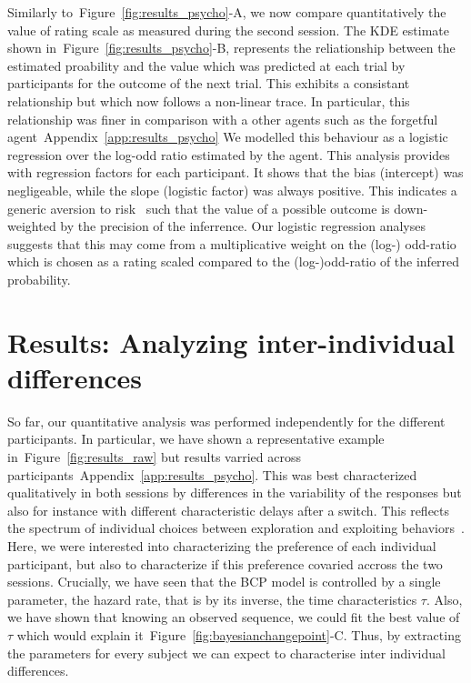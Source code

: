 \documentclass[profile,final,english,draft]{article}%
\newcommand{\citep}[1]{\parencite{#1}}
\newcommand{\seeFig}[1]{Figure~\ref{fig:#1}}
\newcommand{\seeApp}[1]{Appendix~\ref{app:#1}}
\begin{document}
Similarly to~\seeFig{results_psycho}-A,
we now compare quantitatively the value of rating scale
as measured during the second session.
The KDE estimate shown in~\seeFig{results_psycho}-B,
represents the reliationship between
the estimated proability
and the value which was predicted at each trial
by participants for the outcome of the next trial.
This exhibits a consistant relationship
but which now follows a non-linear trace.
In particular, this relationship was finer
in comparison with a other agents
such as the forgetful agent~\seeApp{results_psycho}
We modelled this behaviour as
a logistic regression over
the log-odd ratio estimated by the agent.
This analysis provides with regression factors for each participant.
It shows that the bias (intercept)
was negligeable, while the slope (logistic factor)
was always positive.
This indicates a generic aversion to risk~\citep{KanehmanXX}
such that the value of a possible outcome
is down-weighted by the precision of the inferrence.
Our logistic regression analyses
suggests that this may come from a multiplicative weight
on the (log-) odd-ratio which is chosen as a rating scaled
compared to the (log-)odd-ratio of the inferred probability.

\section{Results: Analyzing inter-individual differences}
\label{sec:inter}
So far, our quantitative analysis was performed independently
for the different participants.
In particular, we have shown a representative example in~\seeFig{results_raw}
but results varried across participants~\seeApp{results_psycho}.
This was best characterized qualitatively in both sessions by differences
in the variability of the responses but also for instance
with different characteristic delays after a switch.
This reflects the spectrum of individual choices
between exploration and exploiting behaviors~\citep{Behrens07}.
Here, we were interested into characterizing the preference
of each individual participant, but also to characterize
if this preference covaried accross the two sessions.
Crucially, we have seen that the BCP model is controlled by a single parameter,
the hazard rate, that is by its inverse, the time characteristics $\tau$.
Also, we have shown that knowing an observed sequence,
we could fit the best value of $\tau$ which would explain it~\seeFig{bayesianchangepoint}-C.
Thus, by extracting the parameters for every subject
we can expect to characterise inter individual differences.
\end{document}
